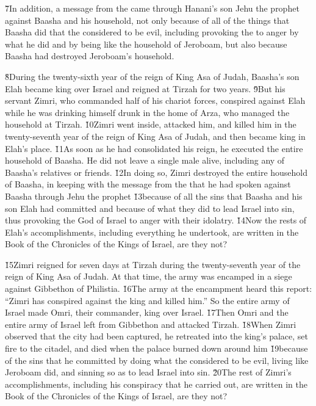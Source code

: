 \v{7}In addition, a message from the  came through Hanani's son Jehu the prophet against Baasha and his household, not only because of all of the things that Baasha did that the  considered to be evil, including provoking the  to anger by what he did and by being like the household of Jeroboam, but also because Baasha had destroyed Jeroboam's household.

\v{8}During the twenty-sixth year of the reign of King Asa of Judah, Baasha's son Elah became king over Israel and reigned at Tirzah for two years. \v{9}But his servant Zimri, who commanded half of his chariot forces, conspired against Elah while he was drinking himself drunk in the home of Arza, who managed the household at Tirzah. \v{10}Zimri went inside, attacked him, and killed him in the twenty-seventh year of the reign of King Asa of Judah, and then became king in Elah's place. \v{11}As soon as he had consolidated his reign, he executed the entire household of Baasha. He did not leave a single male alive, including any of Baasha's relatives or friends. \v{12}In doing so, Zimri destroyed the entire household of Baasha, in keeping with the message from the  that he had spoken against Baasha through Jehu the prophet \v{13}because of all the sins that Baasha and his son Elah had committed and because of what they did to lead Israel into sin, thus provoking the  God of Israel to anger with their idolatry. \v{14}Now the rests of Elah's accomplishments, including everything he undertook, are written in the Book of the Chronicles of the Kings of Israel, are they not?

\v{15}Zimri reigned for seven days at Tirzah during the twenty-seventh year of the reign of King Asa of Judah. At that time, the army was encamped in a siege against Gibbethon of Philistia. \v{16}The army at the encampment heard this report: ``Zimri has conspired against the king and killed him.'' So the entire army of Israel made Omri, their commander, king over Israel. \v{17}Then Omri and the entire army of Israel left from Gibbethon and attacked Tirzah. \v{18}When Zimri observed that the city had been captured, he retreated into the king's palace, set fire to the citadel, and died when the palace burned down around him \v{19}because of the sins that he committed by doing what the  considered to be evil, living like Jeroboam did, and sinning so as to lead Israel into sin. \v{20}The rest of Zimri's accomplishments, including his conspiracy that he carried out, are written in the Book of the Chronicles of the Kings of Israel, are they not?

